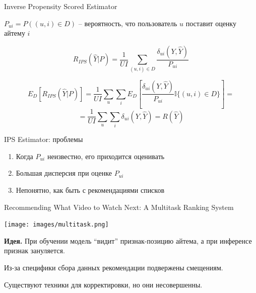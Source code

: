 \documentclass[11pt,aspectratio=169,handout]{beamer}
\begin{document}
\begin{frame}{Inverse Propensity Scored Estimator \cite{TREATMENTS}}

$P_{ui} = P((u, i) \in D)$ -- вероятность, что пользователь $u$ поставит оценку айтему $i$

\[
R_{IPS}(\hat Y | P) = \frac{1}{U I} \sum_{(u,i) \in D} \frac{\delta_{ui}(Y, \hat Y)}{P_{ui}}
\]

\[
E_D [R_{IPS}(\hat Y | P)] = \frac{1}{U I} \sum_u \sum_i E_D\left[ \frac{\delta_{ui}(Y, \hat Y)}{P_{ui}} \mathbb{I}\{(u, i) \in D\}\right] = 
\]
\[
= \frac{1}{U I} \sum_u \sum_i \delta_{ui} (Y, \hat Y) = R(\hat Y) 
\]

\end{frame}

\begin{frame}{IPS Estimator: проблемы}

\begin{enumerate}
\item Когда $P_{ui}$ неизвестно, его приходится оценивать
\item Большая дисперсия при оценке $P_{ui}$
\item Непонятно, как быть с рекомендациями списков
\end{enumerate}

\end{frame}

\begin{frame}{Recommending What Video to Watch Next: A Multitask Ranking System \cite{YT}}

\begin{center}
\texttt{[image: images/multitask.png]}
\end{center}

{\bf Идея.} При обучении модель ``видит'' признак-позицию айтема, а при инференсе признак зануляется. 

\end{frame}

\begin{frame}

\begin{tcolorbox}[colback=info!5,colframe=info!80,title=]
Из-за специфики сбора данных рекомендации подвержены смещениям. 
\end{tcolorbox}
\begin{tcolorbox}[colback=info!5,colframe=info!80,title=]
Существуют техники для корректировки, но они несовершенны.
\end{tcolorbox}

\end{frame}
\end{document}
